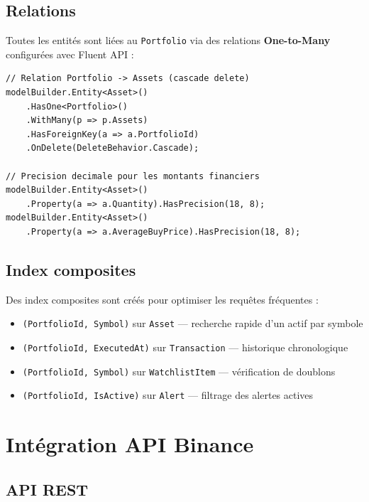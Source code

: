\documentclass[12pt,a4paper]{article}
\begin{document}
\subsection{Relations}

Toutes les entités sont liées au \texttt{Portfolio} via des relations \textbf{One-to-Many} configurées avec Fluent API :

\begin{lstlisting}[caption={Configuration Fluent API --- Relations et précision décimale}]
// Relation Portfolio -> Assets (cascade delete)
modelBuilder.Entity<Asset>()
    .HasOne<Portfolio>()
    .WithMany(p => p.Assets)
    .HasForeignKey(a => a.PortfolioId)
    .OnDelete(DeleteBehavior.Cascade);

// Precision decimale pour les montants financiers
modelBuilder.Entity<Asset>()
    .Property(a => a.Quantity).HasPrecision(18, 8);
modelBuilder.Entity<Asset>()
    .Property(a => a.AverageBuyPrice).HasPrecision(18, 8);
\end{lstlisting}

\subsection{Index composites}

Des index composites sont créés pour optimiser les requêtes fréquentes :

\begin{itemize}
    \item \texttt{(PortfolioId, Symbol)} sur \texttt{Asset} --- recherche rapide d'un actif par symbole
    \item \texttt{(PortfolioId, ExecutedAt)} sur \texttt{Transaction} --- historique chronologique
    \item \texttt{(PortfolioId, Symbol)} sur \texttt{WatchlistItem} --- vérification de doublons
    \item \texttt{(PortfolioId, IsActive)} sur \texttt{Alert} --- filtrage des alertes actives
\end{itemize}

\section{Intégration API Binance}

\subsection{API REST}
\end{document}
